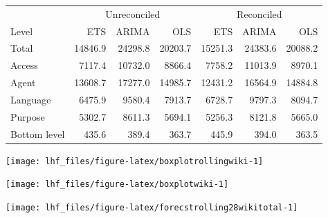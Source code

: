 \documentclass[11pt,a4paper,]{article}
\let\origfigure\figure
\let\endorigfigure\endfigure
\renewenvironment{figure}[1][2] {
    \expandafter\origfigure\expandafter[!htbp]
} {
    \endorigfigure
}
\let\origtable\table
\let\endorigtable\endtable
\renewenvironment{table}[1][2] {
    \expandafter\origtable\expandafter[!htbp]
} {
    \endorigtable
}
\begin{document}
\begin{table}[t]

\caption{\label{tab:wikipediadataresultRMSE}Mean(RMSE) for ETS, ARIMA and OLS with and without reconciliation - Fixed origin - Wikipedia dataset}
\centering
\begin{tabular}{lrrrrrr}
\toprule
\multicolumn{1}{c}{} & \multicolumn{3}{c}{Unreconciled} & \multicolumn{3}{c}{Reconciled} \\
\cmidrule(l{2pt}r{2pt}){2-4} \cmidrule(l{2pt}r{2pt}){5-7}
Level & ETS & ARIMA & OLS & ETS & ARIMA & OLS\\
\midrule
Total & 14846.9 & 24298.8 & 20203.7 & 15251.3 & 24383.6 & 20088.2\\
Access & 7117.4 & 10732.0 & 8866.4 & 7758.2 & 11013.9 & 8970.1\\
Agent & 13608.7 & 17277.0 & 14985.7 & 12431.2 & 16564.9 & 14884.8\\
Language & 6475.9 & 9580.4 & 7913.7 & 6728.7 & 9797.3 & 8094.7\\
Purpose & 5302.7 & 8611.3 & 5694.1 & 5256.3 & 8121.8 & 5665.0\\
Bottom level & 435.6 & 389.4 & 363.7 & 445.9 & 394.0 & 363.5\\
\bottomrule
\end{tabular}
\end{table}

\begin{figure}

{\centering \texttt{[image: lhf\_files/figure-latex/boxplotrollingwiki-1]} 

}

\caption{Box plots of forecast errors for reconciled and unreconciled ETS, ARIMA and OLS methods at each hierarchical level for rolling origin forecasts of Wikipedia pageviews.}\label{fig:boxplotrollingwiki}
\end{figure}

\begin{figure}

{\centering \texttt{[image: lhf\_files/figure-latex/boxplotwiki-1]} 

}

\caption{Box plots of forecast errors for reconciled and unreconciled ETS, ARIMA and OLS methods at each hierarchical level for fixed origin forecasts of Wikipedia pageviews.}\label{fig:boxplotwiki}
\end{figure}

\begin{figure}

{\centering \texttt{[image: lhf\_files/figure-latex/forecstrolling28wikitotal-1]} 

}

\caption{The actual test set for the 'Total' series compared to the forecasts from reconciled and unreconciled ETS, ARIMA and OLS methods for rolling and fixed origin forecasts of Wikipedia pageviews.}\label{fig:forecstrolling28wikitotal}
\end{figure}
\end{document}
